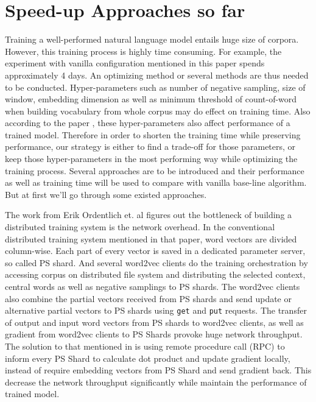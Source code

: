 \section{Speed-up Approaches so far}
Training a well-performed natural language model entails huge size of corpora. However, this training process is highly time consuming. For example, the experiment with vanilla configuration mentioned in this paper spends approximately 4 days. An optimizing method or several methods are thus needed to be conducted. Hyper-parameters such as number of negative sampling, size of window, embedding dimension as well as minimum threshold of count-of-word when building vocabulary from whole corpus may do effect on training time. Also according to the paper \cite{levy2015improving}, these hyper-parameters also affect performance of a trained model. Therefore in order to shorten the training time while preserving performance, our strategy is either to find a trade-off for those parameters, or keep those hyper-parameters in the most performing way while optimizing the training process. Several approaches are to be introduced and their performance as well as training time will be used to compare with vanilla base-line algorithm. But at first we'll go through some existed approaches.

The work from Erik Ordentlich et. al \cite{ordentlich2016network} figures out the bottleneck of building a distributed training system is the network overhead. In the conventional distributed training system mentioned in that paper, word vectors are divided column-wise. Each part of every vector is saved in a dedicated parameter server, so called PS shard. And several word2vec clients do the training orchestration by accessing corpus on distributed file system and distributing the selected context, central words as well as negative samplings to PS shards. The word2vec clients also combine the partial vectors received from PS shards and send update or alternative partial vectors to PS shards using \verb|get| and \verb|put| requests. The transfer of output and input word vectors from PS shards to word2vec clients, as well as gradient from word2vec clients to PS Shards provoke huge network throughput. The solution to that mentioned in \citep{ordentlich2016network} is using remote procedure call (RPC) to inform every PS Shard to calculate dot product and update gradient locally, instead of require embedding vectors from PS Shard and send gradient back. This decrease the network throughput significantly while maintain the performance of trained model.

